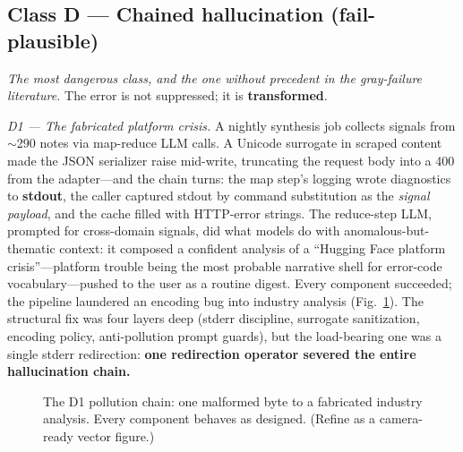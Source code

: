 \documentclass[conference]{IEEEtran}
\begin{document}
\subsection{Class D --- Chained hallucination (fail-plausible)}\label{sec:classd}
\emph{The most dangerous class, and the one without precedent in the
gray-failure literature.} The error is not suppressed; it is
\textbf{transformed}.

\emph{D1 --- The fabricated platform crisis.} A nightly synthesis job
collects signals from $\sim$290 notes via map-reduce LLM calls. A Unicode
surrogate in scraped content made the JSON serializer raise mid-write,
truncating the request body into a 400 from the adapter---and the chain
turns: the map step's logging wrote diagnostics to \textbf{stdout}, the
caller captured stdout by command substitution as the \emph{signal
payload}, and the cache filled with HTTP-error strings. The reduce-step
LLM, prompted for cross-domain signals, did what models do with
anomalous-but-thematic context: it composed a confident analysis of a
``Hugging Face platform crisis''---platform trouble being the most
probable narrative shell for error-code vocabulary---pushed to the user as
a routine digest. Every component succeeded; the pipeline laundered an
encoding bug into industry analysis (Fig.~\ref{fig:d1}). The structural
fix was four layers deep (stderr discipline, surrogate sanitization,
encoding policy, anti-pollution prompt guards), but the load-bearing one
was a single stderr redirection: \textbf{one redirection operator severed
the entire hallucination chain.}

\begin{figure}[t]
\centering
{}
\caption{The D1 pollution chain: one malformed byte to a fabricated
industry analysis. Every component behaves as designed. (Refine as a
camera-ready vector figure.)}
\label{fig:d1}
\end{figure}
\end{document}

